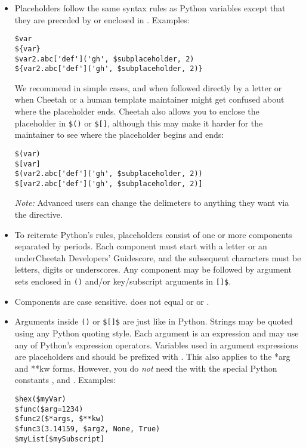 \begin{itemize} 

\item Placeholders follow the same syntax rules as Python variables except
     that they are preceded by \code{\$} or enclosed in \code{\$\{\}}.
     Examples:
\begin{verbatim}
$var                                        
${var}                                      
$var2.abc['def']('gh', $subplaceholder, 2)  
${var2.abc['def']('gh', $subplaceholder, 2)}
\end{verbatim}
     We recommend \code{\$} in simple cases, and \code{\$\{\}} when followed
     directly by a letter or when Cheetah or a human template maintainer might
     get confused about where the placeholder ends.  Cheetah also allows you
     to enclose the placeholder in \verb+$()+ or \verb+$[]+, although this may
     make it harder for the maintainer to see where the placeholder begins and
     ends:
\begin{verbatim}
$(var)                                      
$[var]                                      
$(var2.abc['def']('gh', $subplaceholder, 2))
$[var2.abc['def']('gh', $subplaceholder, 2)]
\end{verbatim}
     {\em Note:} Advanced users can change the delimeters to anything they
     want via the  directive.

\item To reiterate Python's rules, placeholders consist of one or more
     components separated by periods.  Each component must start with a letter
     or an underCheetah Developers' Guidescore, and the subsequent characters must be letters, digits or
     underscores.  Any component may be followed by argument sets enclosed in
     \verb+()+ and/or key/subscript arguments in \verb+[]$+.

\item Components are case sensitive.  does not equal 
     or  or .     
     
\item Arguments inside \verb+()+ or \verb+$[]$+ are just like in Python.
    Strings may be quoted using any Python quoting style.  Each argument is an
    expression and may use any of Python's expression operators.  Variables
    used in argument expressions are placeholders and should be prefixed with
    \code{\$}.  This also applies to the *arg and **kw forms.  However, you do
    {\em not} need the \code{\$} with the special Python constants ,
     and .
     Examples:
\begin{verbatim}
$hex($myVar)
$func($arg=1234)
$func2($*args, $**kw)
$func3(3.14159, $arg2, None, True)
$myList[$mySubscript]
\end{verbatim}
    

\end{itemize}
